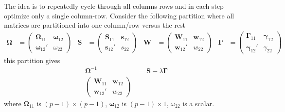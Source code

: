 \documentclass[twoside]{article}
\begin{document}
The idea is to repeatedly cycle through all columns-rows and in each step optimize only a single column-row. Consider the following partition where all matrices are partitioned into one column/row versus the rest
\begin{align*}
    \boldsymbol{\Omega} &= \begin{pmatrix}
        \boldsymbol{\Omega}_{11} & \boldsymbol{\omega}_{12}\\
        \boldsymbol{\omega}_{12}' & \omega_{22}
     \end{pmatrix} & \mathbf{S} &= \begin{pmatrix}
        \mathbf{S}_{11} & \mathbf{s}_{12}\\
        \mathbf{s}_{12}' & s_{22}
     \end{pmatrix} & \mathbf{W} &= \begin{pmatrix}
        \mathbf{W}_{11} & \mathbf{w}_{12}\\
        \mathbf{w}_{12}' & w_{22}
     \end{pmatrix} & \boldsymbol{\Gamma} &= \begin{pmatrix}
        \boldsymbol{\Gamma}_{11} & \boldsymbol{\gamma}_{12}\\
        \boldsymbol{\gamma}_{12}' & \gamma_{22}
     \end{pmatrix}
\end{align*}
this partition gives 
\begin{align*}
    \boldsymbol{\Omega}^{-1} &= \mathbf{S} - \lambda\boldsymbol{\Gamma} \\
    \begin{pmatrix}
        \mathbf{W}_{11} & \mathbf{w}_{12}\\
        \mathbf{w}_{12}' & w_{22}
    \end{pmatrix}
\end{align*}
where $\boldsymbol{\Omega}_{11}$ is $(p-1)\times(p-1)$, $\boldsymbol{\omega}_{12}$ is $(p-1)\times 1$, $\omega_{22}$ is a scalar.
\end{document}
